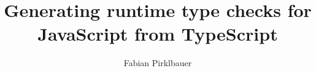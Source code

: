 \documentclass[master,english]{hgbthesis}
\title{Generating runtime type checks for JavaScript from TypeScript}
\author{Fabian Pirklbauer}
\begin{document}

\frontmatter

\maketitle
\tableofcontents


			

\mainmatter









\appendix 

% 

\MakeBibliography



\end{document}
